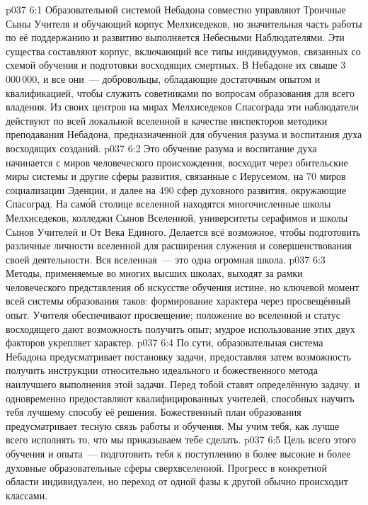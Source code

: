 \vs p037 6:1 Образовательной системой Небадона совместно управляют Троичные Сыны Учителя и обучающий корпус Мелхиседеков, но значительная часть работы по её поддержанию и развитию выполняется Небесными Наблюдателями. Эти существа составляют корпус, включающий все типы индивидуумов, связанных со схемой обучения и подготовки восходящих смертных. В Небадоне их свыше 3\,000\,000, и все они~--- добровольцы, обладающие достаточным опытом и квалификацией, чтобы служить советниками по вопросам образования для всего владения. Из своих центров на мирах Мелхиседеков Спасограда эти наблюдатели действуют по всей локальной вселенной в качестве инспекторов методики преподавания Небадона, предназначенной для обучения разума и воспитания духа восходящих созданий.
\vs p037 6:2 Это обучение разума и воспитание духа начинается с миров человеческого происхождения, восходит через обительские миры системы и другие сферы развития, связанные с Иерусемом, на 70 миров социализации Эденции, и далее на 490 сфер духовного развития, окружающие Спасоград. На сам\'ой столице вселенной находятся многочисленные школы Мелхиседеков, колледжи Сынов Вселенной, университеты серафимов и школы Сынов Учителей и От Века Единого. Делается всё возможное, чтобы подготовить различные личности вселенной для расширения служения и совершенствования своей деятельности. Вся вселенная~--- это одна огромная школа.
\vs p037 6:3 \pc Методы, применяемые во многих высших школах, выходят за рамки человеческого представления об искусстве обучения истине, но ключевой момент всей системы образования таков: формирование характера через просвещённый опыт. Учителя обеспечивают просвещение; положение во вселенной и статус восходящего дают возможность получить опыт; мудрое использование этих двух факторов укрепляет характер.
\vs p037 6:4 По сути, образовательная система Небадона предусматривает постановку задачи, предоставляя затем возможность получить инструкции относительно идеального и божественного метода наилучшего выполнения этой задачи. Перед тобой ставят определённую задачу, и одновременно предоставляют квалифицированных учителей, способных научить тебя лучшему способу её решения. Божественный план образования предусматривает тесную связь работы и обучения. Мы учим тебя, как лучше всего исполнять то, что мы приказываем тебе сделать.
\vs p037 6:5 Цель всего этого обучения и опыта~--- подготовить тебя к поступлению в более высокие и более духовные образовательные сферы сверхвселенной. Прогресс в конкретной области индивидуален, но переход от одной фазы к другой обычно происходит классами.
